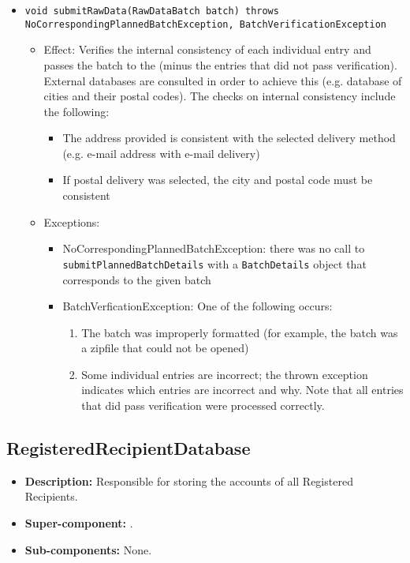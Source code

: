 \begin{itemize}
\begin{itemize}
		\item \texttt{void submitRawData(RawDataBatch batch) throws NoCorrespondingPlannedBatchException, BatchVerificationException}
		\begin{itemize}
			\item Effect: Verifies the internal consistency of each individual entry and passes the batch to the  (minus the entries that did not pass verification). External databases are consulted in order to achieve this (e.g. database of cities and their postal codes). The checks on internal consistency include the following:
			\begin{itemize}
				\item The address provided is consistent with the selected delivery method (e.g. e-mail address with e-mail delivery)
				\item If postal delivery was selected, the city and postal code must be consistent
			\end{itemize}
			\item Exceptions:
			\begin{itemize}
				\item NoCorrespondingPlannedBatchException: there was no call to \texttt{submitPlannedBatchDetails} with a \texttt{BatchDetails} object that corresponds to the given batch
				\item BatchVerficationException: One of the following occurs:
				\begin{enumerate}
					\item The batch was improperly formatted (for example, the batch was a zipfile that could not be opened)
					\item Some individual entries are incorrect; the thrown exception indicates which entries are incorrect and why. Note that all entries that did pass verification were processed correctly.
				\end{enumerate} 
			\end{itemize}
		\end{itemize}
	\end{itemize}
\end{itemize}

\subsection{RegisteredRecipientDatabase}
\begin{itemize}
    \item \textbf{Description:} Responsible for storing the accounts of all Registered Recipients.
    \item \textbf{Super-component:} .
    \item \textbf{Sub-components:} None.
\end{itemize}

